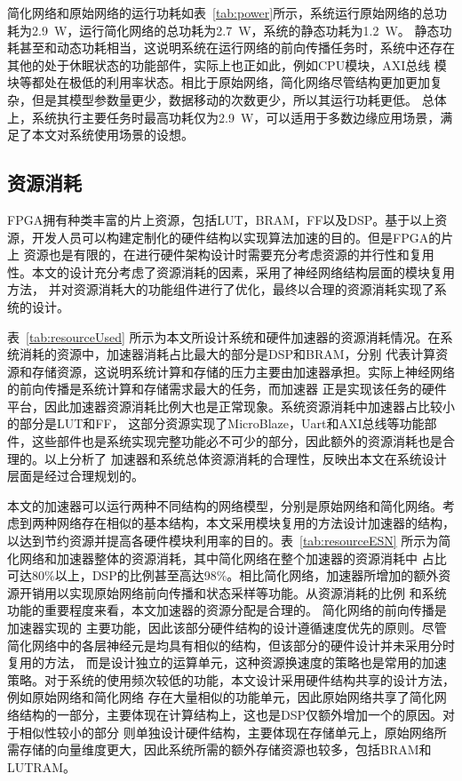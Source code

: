简化网络和原始网络的运行功耗如表~\ref{tab:power}所示，系统运行原始网络的总功耗为2.9~W，运行简化网络的总功耗为2.7~W，系统的静态功耗为1.2~W。
静态功耗甚至和动态功耗相当，这说明系统在运行网络的前向传播任务时，系统中还存在其他的处于休眠状态的功能部件，实际上也正如此，例如CPU模块，AXI总线
模块等都处在极低的利用率状态。相比于原始网络，简化网络尽管结构更加更加复杂，但是其模型参数量更少，数据移动的次数更少，所以其运行功耗更低。
总体上，系统执行主要任务时最高功耗仅为2.9~W，可以适用于多数边缘应用场景，满足了本文对系统使用场景的设想。

\subsection{资源消耗}
FPGA拥有种类丰富的片上资源，包括LUT，BRAM，FF以及DSP。基于以上资源，开发人员可以构建定制化的硬件结构以实现算法加速的目的。但是FPGA的片上
资源也是有限的，在进行硬件架构设计时需要充分考虑资源的并行性和复用性。本文的设计充分考虑了资源消耗的因素，采用了神经网络结构层面的模块复用方法，
并对资源消耗大的功能组件进行了优化，最终以合理的资源消耗实现了系统的设计。


表~\ref{tab:resourceUsed} 所示为本文所设计系统和硬件加速器的资源消耗情况。在系统消耗的资源中，加速器消耗占比最大的部分是DSP和BRAM，分别
代表计算资源和存储资源，这说明系统计算和存储的压力主要由加速器承担。实际上神经网络的前向传播是系统计算和存储需求最大的任务，而加速器
正是实现该任务的硬件平台，因此加速器资源消耗比例大也是正常现象。系统资源消耗中加速器占比较小的部分是LUT和FF，
这部分资源实现了MicroBlaze，Uart和AXI总线等功能部件，这些部件也是系统实现完整功能必不可少的部分，因此额外的资源消耗也是合理的。以上分析了
加速器和系统总体资源消耗的合理性，反映出本文在系统设计层面是经过合理规划的。

本文的加速器可以运行两种不同结构的网络模型，分别是原始网络和简化网络。考虑到两种网络存在相似的基本结构，本文采用模块复用的方法设计加速器的结构，
以达到节约资源并提高各硬件模块利用率的目的。表~\ref{tab:resourceESN} 所示为简化网络和加速器整体的资源消耗，其中简化网络在整个加速器的资源消耗中
占比可达80\%以上，DSP的比例甚至高达98\%。相比简化网络，加速器所增加的额外资源开销用以实现原始网络前向传播和状态采样等功能。从资源消耗的比例
和系统功能的重要程度来看，本文加速器的资源分配是合理的。
简化网络的前向传播是加速器实现的
主要功能，因此该部分硬件结构的设计遵循速度优先的原则。尽管简化网络中的各层神经元是均具有相似的结构，但该部分的硬件设计并未采用分时复用的方法，
而是设计独立的运算单元，这种资源换速度的策略也是常用的加速策略。对于系统的使用频次较低的功能，本文设计采用硬件结构共享的设计方法，例如原始网络和简化网络
存在大量相似的功能单元，因此原始网络共享了简化网络结构的一部分，主要体现在计算结构上，这也是DSP仅额外增加一个的原因。对于相似性较小的部分
则单独设计硬件结构，主要体现在存储单元上，原始网络所需存储的向量维度更大，因此系统所需的额外存储资源也较多，包括BRAM和LUTRAM。



